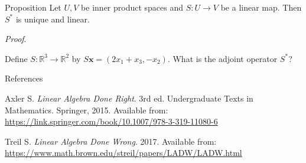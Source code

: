 \documentclass [aspectratio=169]{beamer}
\newcommand{\bx}{{\mathbf{x}}}
\newcommand{\R}{{\mathbb{R}}}
\begin{document}
\begin{frame}
\begin{exampleblock}{Proposition}
Let $U,V$ be inner product spaces and $S\colon U \to V$ be a linear map. Then $S^*$ is unique and linear.
\end{exampleblock}

\textit{Proof}.
\vspace{5.5cm}

\end{frame}


\begin{frame}
\begin{example}
Define $S \colon \R^3 \to \R^2$ by $S\bx = (2x_1+x_3,-x_2)$. What is the adjoint operator $S^*$?
\end{example}
\vspace{5.5cm}

\end{frame}



\begin{frame}{References}

Axler S. \textit{Linear Algebra Done Right}. 3rd ed. Undergraduate Texts in Mathematics. Springer, 2015.
Available from: \href{https://link.springer.com/book/10.1007/978-3-319-11080-6}{https://link.springer.com/book/10.1007/978-3-319-11080-6} 

\vspace{1em}


\indent Treil S. \textit{Linear Algebra Done Wrong}. 2017. Available from: \href{https://www.math.brown.edu/streil/papers/LADW/LADW.html}{https://www.math.brown.edu/streil/papers/LADW/LADW.html}
\end{frame}
\end{document}
